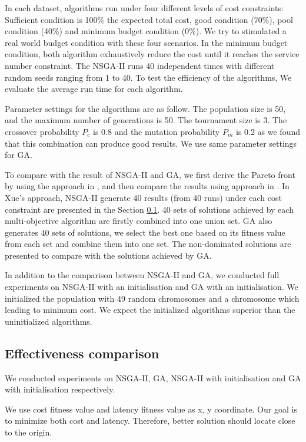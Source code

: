 \documentclass{llncs}
\begin{document}
In each dataset, algorithms run under four different levels of cost constraints: Sufficient condition is 100\% the expected total cost, 
good condition (70\%), pool condition (40\%) and minimum budget condition (0\%). We try to stimulated a real world budget condition with these four 
scenarios. In the minimum budget condition, 
both algorithm exhaustively reduce the cost until it reaches the service number constraint. The NSGA-II runs 40 independent times with different random 
seeds ranging from 1 to 40. To test the efficiency of the algorithms, We evaluate the average run time for each algorithm. 


Parameter settings for the algorithms are as follow. The population size is 50, and the maximum number of 
generations is 50. The tournament size is 3. 
The crossover probability $P_{c}$ is 0.8 and the mutation probability $P_{m}$ 
is 0.2 as we found that this combination can produce good results. We use same parameter settings for GA. 

To compare with the result of NSGA-II and GA, we first derive the Pareto front by using the approach in \cite{Xue} \cite{6381531}, and then compare the results using approach in \cite{1688438}.
In Xue's approach, NSGA-II generate 40 results (from 40 runs) under each cost constraint 
are presented in the Section \ref{sec:comparison}. 40 sets of solutions 
achieved by each multi-objective algorithm are firstly combined into one union set. GA also generates 40 sets of 
solutions, we select the best one based on its fitness value from each set and combine them into one set. 
The non-dominated solutions are presented to compare with the solutions achieved by GA.

In addition to the comparison between NSGA-II and GA, we conducted full experiments on NSGA-II with an initialisation and GA with an initialisation.
We initialized the population with 49 random chromosomes and a chromosome which leading to minimum cost. We expect the initialized algorithms superior than
the uninitialized algorithms.

\subsection{Effectiveness comparison}
\label{sec:comparison}
We conducted experiments on NSGA-II, GA, NSGA-II with initialisation and GA with initialisation respectively.

We use cost fitness value and latency fitness value as 
x, y coordinate. Our goal is to minimize both cost and latency. Therefore, better solution should locate close to the origin.
\end{document}
